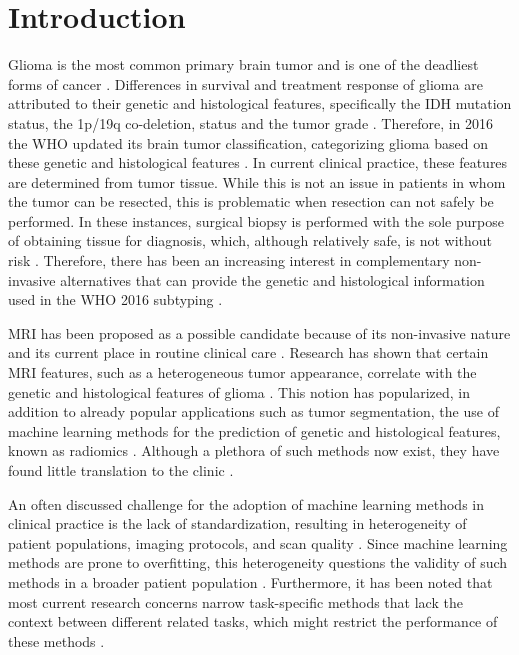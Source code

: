 \section{Introduction}
Glioma is the most common primary brain \gls{tumor} and is one of the deadliest forms of cancer \autocite{office2019cancer}.
Differences in survival and treatment response of glioma are attributed to their genetic and histological features, specifically the \gls{IDH} mutation status, the 1p/19q co-deletion, status and the \gls{tumor} grade \autocite{dubbink2015molecular, eckel2015gliomagroups}.
Therefore, in 2016 the \gls{WHO} updated its brain \gls{tumor} classification, categorizing glioma based on these genetic and histological features \autocite{louis20162016}.
In current clinical practice, these features are determined from \gls{tumor} tissue.
While this is not an issue in patients in whom the \gls{tumor} can be resected, this is problematic when resection can not safely be performed.
In these instances,  surgical biopsy is performed with the sole purpose of obtaining tissue for diagnosis, which, although relatively safe, is not without risk \autocite{chen2009biopsy, jackson2001biopsylimitations}.
Therefore, there has been an increasing interest in complementary non-invasive alternatives that can provide the genetic and histological information used in the \gls{WHO} 2016 subtyping \autocite{zhou2018radiomicsbrain, bi2019AIcancer}.

\Gls{MRI} has been proposed as a possible candidate because of its non-invasive nature and its current place in routine clinical care \autocite{chaddad2019radiomicsglioblastoma}.
Research has shown that certain \gls{MRI} features, such as a heterogeneous \gls{tumor} appearance, correlate with the genetic and histological features of glioma \autocite{smits2016imaging, delfanti2017imagingcorrelates}.
This notion has popularized, in addition to already popular applications such as \gls{tumor} segmentation, the use of machine learning methods for the prediction of genetic and histological features, known as radiomics \autocite{gore2020review, aerts2014radiomics, chichate2020review}.
Although a plethora of such methods now exist, they have found little translation to the clinic \autocite{gore2020review}.

An often discussed challenge for the adoption of machine learning methods in clinical practice is the lack of standardization, resulting in heterogeneity of patient populations, imaging protocols, and scan quality \autocite{gillies2016radiomics, thrall2018AIradiology}.
Since machine learning methods are prone to overfitting, this heterogeneity questions the validity of such methods in a broader patient population \autocite{thrall2018AIradiology}.
Furthermore, it has been noted that most current research concerns narrow task-specific methods that lack the context between different related tasks, which might restrict the performance of these methods \autocite{hosny2018AI}.

